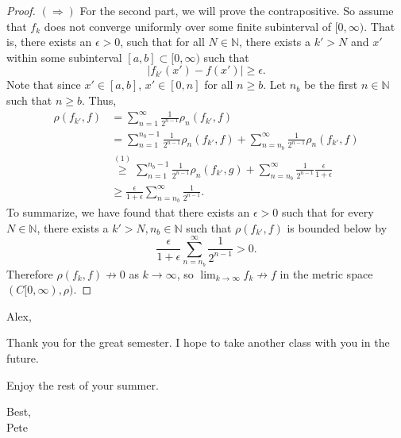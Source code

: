 \documentclass[12pt]{article}
\begin{document}
\begin{itemize}[label={},leftmargin=4mm, itemsep=1em, parsep=1em]
\begin{proof}
    $(\Rightarrow)$ For the second part, we will prove the contrapositive. So assume
    that $f_{k}$ does not converge uniformly over some finite subinterval of
    $[0,\infty)$. That is, there exists an $\epsilon > 0$, such that for all $N \in \mathbb{N}$, 
    there exists a $k' > N$ and $x'$ within some subinterval $[a,b] \subset [0,\infty)$ such that 
    \begin{equation}
      |f_{k'}(x') - f(x')| \geq \epsilon.
    \end{equation}
    Note that since $x' \in [a,b]$, $x'\in[0,n]$ for all $n \geq b$. Let $n_{b}$
    be the first $n \in \mathbb{N}$ such that $n \geq b$. Thus,
    \begin{align*}
      \rho(f_{k'}, f) & = \sum_{n=1}^{\infty}\frac{1}{2^{n-1}}\rho_{n}(f_{k'},f)
      \\
      & = \sum_{n=1}^{n_{b}-1}\frac{1}{2^{n-1}}\rho_{n}(f_{k'},f) +
      \sum_{n=n_{b}}^{\infty}\frac{1}{2^{n-1}}\rho_{n}(f_{k'},f) \\
      & \stackrel{(1)}{\geq}
      \sum_{n=1}^{n_{b}-1}\frac{1}{2^{n-1}}\rho_{n}(f_{k'},g) +
      \sum_{n=n_{b}}^{\infty}\frac{1}{2^{n-1}}\frac{\epsilon}{1+\epsilon} \\
      & \geq
      \frac{\epsilon}{1+\epsilon}\sum_{n=n_{b}}^{\infty}\frac{1}{2^{n-1}}.
    \end{align*}
    To summarize, we have found that there exists an $\epsilon > 0$ such that for every $N\in \mathbb{N}$, 
    there exists a $k' > N, n_{b}\in \mathbb{N}$ such that $\rho(f_{k'},f)$ is bounded below by 
    \[ \frac{\epsilon}{1+\epsilon}\sum_{n=n_{b}}^{\infty}\frac{1}{2^{n-1}} > 0. \]
    Therefore $\rho(f_{k},f)\nrightarrow 0$ as $k\rightarrow \infty$, so
    $\lim_{k\rightarrow \infty}f_{k}\nrightarrow f$ in the metric space
    $(C[0,\infty), \rho)$.
  \end{proof}
\end{itemize}

\vspace{20mm}

\hrulefill

Alex,

Thank you for the great semester. I hope to take another class with you in the
future.

Enjoy the rest of your summer.

Best,\\
Pete

\hrulefill
\end{document}
